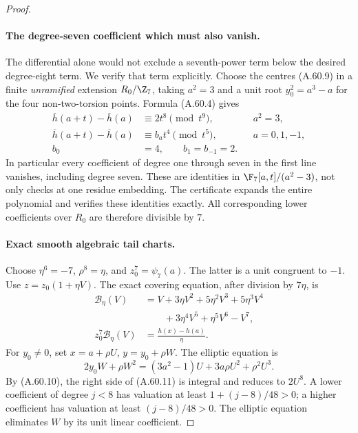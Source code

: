 \begin{proof}
\paragraph{The degree-seven coefficient which must also vanish.}
The differential alone would not exclude a seventh-power
term below the desired degree-eight term. We verify that
term explicitly. Choose the centres (A.60.9) in a finite
\emph{unramified} extension \(R_0/\Z_7\), taking
\(a^2=3\) and a unit root \(y_0^2=a^3-a\) for the
four non-two-torsion points. Formula (A.60.4) gives
\[
 \begin{aligned}
  \overline h(a+t)-\overline h(a)&\equiv2t^8\pmod {t^9},
                                      &&a^2=3,\\
  \overline h(a+t)-\overline h(a)&\equiv b_at^4\pmod {t^5},
                                      &&a=0,1,-1,\\
                         b_0&=4,\qquad b_1=b_{-1}=2.
 \end{aligned}                                          \tag{A.60.10}
\]
In particular every coefficient of degree one through
seven in the first line vanishes, including degree
seven. These are identities in
\(\F_7[a,t]/(a^2-3)\), not only checks at one residue
embedding. The certificate expands the entire
polynomial and verifies these identities exactly.
All corresponding lower coefficients over \(R_0\)
are therefore divisible by \(7\).

\paragraph{Exact smooth algebraic tail charts.}
Choose \(\eta^6=-7\), \(\rho^8=\eta\), and
\(z_0^7=\psi _7(a)\). The latter is a unit congruent
to \(-1\). Use \(z=z_0(1+\eta V)\). The exact
covering equation, after division by \(7\eta\), is
\[
 \begin{aligned}
 \mathcal B_\eta(V)&=V+3\eta V^2+5\eta^2V^3+5\eta^3V^4\\
                  &\qquad+3\eta^4V^5+\eta^5V^6-V^7,\\
 z_0^7\mathcal B_\eta(V)&=\frac{h(x)-h(a)}{\eta}.
 \end{aligned}                                            \tag{A.60.11}
\]
For \(y_0\ne0\), set \(x=a+\rho U\),
\(y=y_0+\rho W\). The elliptic equation is
\[
 2y_0W+\rho W^2
              =(3a^2-1)U+3a\rho U^2+\rho^2U^3.       \tag{A.60.12}
\]
By (A.60.10), the right side of (A.60.11) is
integral and reduces to \(2U^8\). A lower coefficient
of degree \(j<8\) has valuation at least
\(1+(j-8)/48>0\); a higher coefficient has valuation
at least \((j-8)/48>0\). The elliptic equation
eliminates \(W\) by its unit linear coefficient.


\end{proof}
